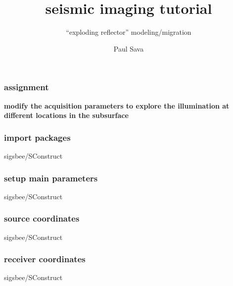
\title[]{seismic imaging tutorial}
\subtitle{``exploding reflector'' modeling/migration}
\author[]{Paul Sava}
\date{}
\large

\def\big#1{\begin{center} \LARGE \textbf{#1} \end{center}}

 { \cwpcover }


\begin{frame} \frametitle{assignment}

\big{modify the acquisition parameters to explore the illumination at
different locations in the subsurface}

\end{frame}
\cwpnote{}

\begin{frame} \frametitle{import packages}
\normalsize 

		{sigsbee/SConstruct}
\end{frame}
\cwpnote{}

\begin{frame} \frametitle{setup main parameters}
\normalsize 

		{sigsbee/SConstruct}
\end{frame}
\cwpnote{}

\begin{frame} \frametitle{source coordinates}
\normalsize 

		{sigsbee/SConstruct}
\end{frame}
\cwpnote{}

\begin{frame} \frametitle{receiver coordinates}
\normalsize 

		{sigsbee/SConstruct}
\end{frame}
\cwpnote{}

